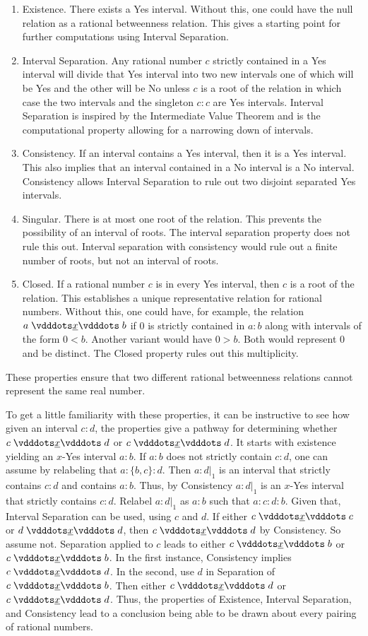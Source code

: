 \documentclass[12pt]{article}
\begin{document}
\begin{enumerate}
    \item Existence. There exists a Yes interval. Without this, one could have the null relation as a rational betweenness relation. This gives a starting point for further computations using Interval Separation. 
    \item Interval Separation. Any rational number $c$ strictly contained in a Yes interval will divide that Yes interval into two new intervals one of which will be Yes and the other will be No unless $c$ is a root of the relation in which case the two intervals and the singleton $c:c$ are Yes intervals. Interval Separation is inspired by the Intermediate Value Theorem and is the computational property allowing for a narrowing down of intervals. 
    \item Consistency. If an interval contains a Yes interval, then it is a Yes interval. This also implies that an interval contained in a No interval is a No interval. Consistency allows Interval Separation to rule out two disjoint separated Yes intervals. 
    \item Singular. There is at most one root of the relation. This prevents the possibility of an interval of roots. The interval separation property does not rule this out. Interval separation with consistency would rule out a finite number of roots, but not an interval of roots.  
    \item Closed. If a rational number $c$ is in every Yes interval, then $c$ is a root of the relation. This establishes a unique representative relation for rational numbers. Without this, one could have, for example, the relation $ a \xrel b$ if 0 is strictly contained in $a:b$ along with intervals of the form $0 < b$. Another variant would have $0 > b$. Both would represent 0 and be distinct. The Closed property rules out this multiplicity. 
\end{enumerate}

These properties ensure that two different rational betweenness relations cannot represent the same real number. 

To get a little familiarity with these properties, it can be instructive to see how given an interval $c:d$, the properties give a pathway for determining whether $c \xrel d$ or \sout{$c \xrel d$}. It starts with existence yielding an $x$-Yes interval $a:b$. If $a:b$ does not strictly contain $c:d$, one can assume by relabeling that $a:\{b, c\} :d$. Then $a:d|_1$ is an interval that strictly contains $c:d$ and contains $a:b$. Thus, by Consistency $a:d|_1$ is an $x$-Yes interval that strictly contains $c:d$. Relabel $a:d|_1$ as $a:b$ such that $a:c:d:b$. Given that, Interval Separation can be used, using $c$ and $d$. If either $c \xrel c$ or $d \xrel d$, then $c \xrel d$ by Consistency. So assume not. Separation applied to $c$ leads to either \sout{$c \xrel b$} or $c \xrel b$. In the first instance, Consistency implies \sout{$c \xrel d$}. In the second, use $d$ in Separation of $c \xrel b$. Then either $c \xrel d$ or \sout{$c \xrel d$}. Thus, the properties of Existence, Interval Separation, and Consistency lead to a conclusion being able to be drawn about every pairing of rational numbers. 
\end{document}
